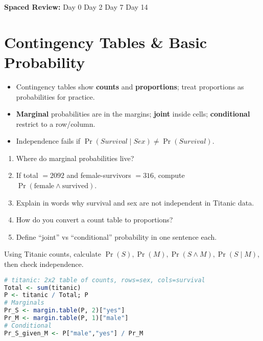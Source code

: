 \documentclass[11pt,a4paper]{article}
\newcommand{\reviewticks}{
  \vspace{0.4em}
  \noindent\scriptsize\textbf{Spaced Review:}
  \fbox{\phantom{D0}} Day 0\quad
  \fbox{\phantom{D2}} Day 2\quad
  \fbox{\phantom{D7}} Day 7\quad
  \fbox{\phantom{D14}} Day 14
}
\begin{document}
\reviewticks

\section{Contingency Tables \& Basic Probability}

\begin{corebox}
\begin{itemize}
  \item Contingency tables show \textbf{counts} and \textbf{proportions}; treat proportions as probabilities for practice.
  \item \textbf{Marginal} probabilities are in the margins; \textbf{joint} inside cells; \textbf{conditional} restrict to a row/column.
  \item Independence fails if \( \Pr(Survival \mid Sex) \ne \Pr(Survival) \).
\end{itemize}
\end{corebox}

\begin{recallbox}
\begin{enumerate}
  \item Where do marginal probabilities live?
  \item If total \(= 2092\) and female-survivors \(= 316\), compute \( \Pr(\text{female} \land \text{survived}) \).
  \item Explain in words why survival and sex are not independent in Titanic data.
  \item How do you convert a count table to proportions?
  \item Define ``joint'' vs ``conditional'' probability in one sentence each.
\end{enumerate}
\end{recallbox}

\begin{practicebox}
Using Titanic counts, calculate \( \Pr(S), \Pr(M), \Pr(S \land M), \Pr(S\mid M)\), then check independence.
\end{practicebox}

\begin{rbox}
\begin{lstlisting}[language=R]
# titanic: 2x2 table of counts, rows=sex, cols=survival
Total <- sum(titanic)
P <- titanic / Total; P
# Marginals
Pr_S <- margin.table(P, 2)["yes"]
Pr_M <- margin.table(P, 1)["male"]
# Conditional
Pr_S_given_M <- P["male","yes"] / Pr_M
\end{lstlisting}
\end{rbox}
\end{document}
